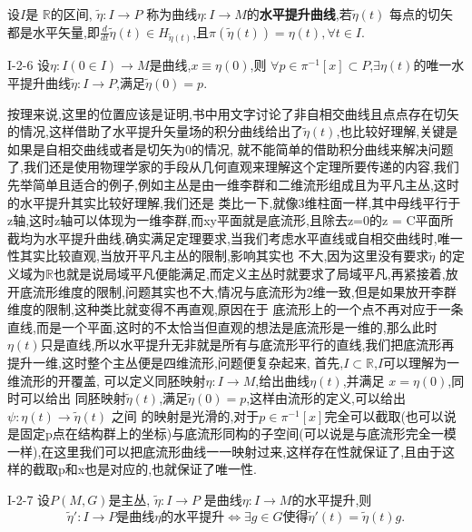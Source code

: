 \documentclass[../main.tex]{subfiles}
\begin{document}
设$I$是 $\mathbb{R}$的区间, $\tilde{\eta}:I\to P$ 称为曲线$\eta:I\to M$的\textbf{水平提升曲线},若$\tilde{\eta}(t)$ 每点的切矢都是水平矢量,即$\frac{d}{dt}\tilde{\eta}(t) \in H_{\tilde{\eta}(t)}$,且$\pi(\tilde{\eta}(t)) = \eta(t),\forall t \in I$.
\begin{theorem}
  {}{I-2-6}
  设$\eta:I(0\in I)\to M$是曲线,$x \equiv \eta(0)$,则 $\forall p \in \pi^{-1}[x] \subset P$,$\exists \eta(t)$的唯一水平提升曲线$\tilde{\eta}:I\to P$,满足$\tilde{\eta}(0) = p$.
\end{theorem}
\begin{note}
 按理来说,这里的位置应该是证明,书中用文字讨论了非自相交曲线且点点存在切矢的情况,这样借助了水平提升矢量场的积分曲线给出了$\tilde{\eta}(t)$,也比较好理解,关键是如果是自相交曲线或者是切矢为0的情况,
 就不能简单的借助积分曲线来解决问题了,我们还是使用物理学家的手段从几何直观来理解这个定理所要传递的内容,我们先举简单且适合的例子,例如主丛是由一维李群和二维流形组成且为平凡主丛,这时的水平提升其实比较好理解,我们还是
 类比一下,就像3维柱面一样,其中母线平行于z轴,这时z轴可以体现为一维李群,而xy平面就是底流形,且除去z=0的z = C平面所截均为水平提升曲线,确实满足定理要求,当我们考虑水平直线或自相交曲线时,唯一性其实比较直观,当放开平凡主丛的限制,影响其实也
 不大,因为这里没有要求$\tilde{\eta}$ 的定义域为$\mathbb{R}$也就是说局域平凡便能满足,而定义主丛时就要求了局域平凡,再紧接着,放开底流形维度的限制,问题其实也不大,情况与底流形为2维一致,但是如果放开李群维度的限制,这种类比就变得不再直观,原因在于
 底流形上的一个点不再对应于一条直线,而是一个平面,这时的不太恰当但直观的想法是底流形是一维的,那么此时$\eta(t)$只是直线,所以水平提升无非就是所有与底流形平行的直线,我们把底流形再提升一维,这时整个主丛便是四维流形,问题便复杂起来,
 首先,$I \subset \mathbb{R}$,$I$可以理解为一维流形的开覆盖, 可以定义同胚映射$\eta:I \to M$,给出曲线$\eta(t)$,并满足 $x = \eta(0)$,同时可以给出 同胚映射$\tilde{\eta}(t)$,满足$\tilde{\eta}(0) = p$,这样由流形的定义,可以给出$\psi:\eta(t) \to \tilde{\eta}(t)$ 之间
 的映射是光滑的,对于$p \in \pi^{-1}[x]$完全可以截取(也可以说是固定p点在结构群上的坐标)与底流形同构的子空间(可以说是与底流形完全一模一样),在这里我们可以把底流形曲线一一映射过来,这样存在性就保证了,且由于这样的截取p和x也是对应的,也就保证了唯一性.

 \end{note}
\begin{theorem}
  {}{I-2-7}  
  设$P(M,G)$是主丛, $\tilde{\eta}: I \to P$ 是曲线$\eta: I \to M$的水平提升,则\[
   \tilde{\eta}':I\to P \text{是曲线}\eta\text{的水平提升} \Leftrightarrow \exists g\in G\text{使得}\tilde{\eta}'(t) = \tilde{\eta}(t)g
.\]
\end{theorem}
\end{document}
